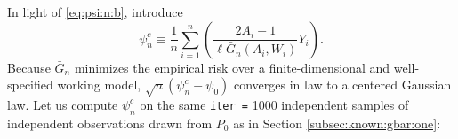 \documentclass[]{article}
\newenvironment{Shaded}{\begin{snugshade}}{\end{snugshade}}
\newcommand{\DataTypeTok}[1]{\textcolor[rgb]{0.13,0.29,0.53}{#1}}
\newcommand{\DecValTok}[1]{\textcolor[rgb]{0.00,0.00,0.81}{#1}}
\newcommand{\KeywordTok}[1]{\textcolor[rgb]{0.13,0.29,0.53}{\textbf{#1}}}
\newcommand{\NormalTok}[1]{#1}
\newcommand{\OperatorTok}[1]{\textcolor[rgb]{0.81,0.36,0.00}{\textbf{#1}}}
\newcommand{\StringTok}[1]{\textcolor[rgb]{0.31,0.60,0.02}{#1}}
\newcommand{\Gbar}{\bar{G}}
\theoremstyle{definition}
\theoremstyle{definition}
\theoremstyle{definition}
\theoremstyle{remark}
\begin{document}
In light of \eqref{eq:psi:n:b}, introduce
\begin{equation}\psi_{n}^{c} \equiv
\frac{1}{n}   \sum_{i=1}^{n}   \left(\frac{2A_{i}  -   1}{\ell\Gbar_{n}(A_{i},
W_{i})}   Y_{i}\right).\end{equation} Because \(\Gbar_{n}\) minimizes
the empirical risk over a finite-dimensional and well-specified working
model, \(\sqrt{n} (\psi_{n}^{c} - \psi_{0})\) converges in law to a
centered Gaussian law. Let us compute \(\psi_{n}^{c}\) on the same
\texttt{iter\ =} 1000 independent samples of independent observations
drawn from \(P_{0}\) as in Section \ref{subsec:known:gbar:one}:

\begin{Shaded}
\end{Shaded}
\end{document}
